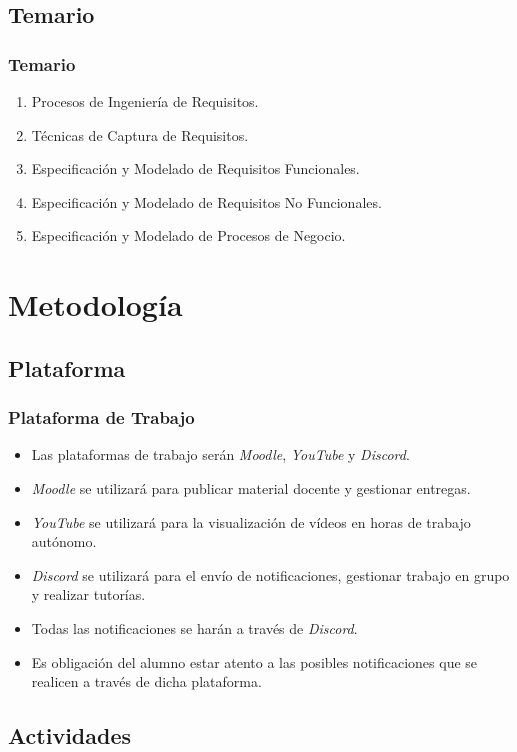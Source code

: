 \documentclass[a4paper,slidestop,xcolor=pst,dvips,blue]{beamer}
\begin{document}
\subsection{Temario}

\begin{frame}[c]
	\frametitle{Temario}
	\begin{enumerate}[<+->]
		\item Procesos de Ingeniería de Requisitos.
		\item Técnicas de Captura de Requisitos.
		\item Especificación y Modelado de Requisitos Funcionales.
		\item Especificación y Modelado de Requisitos No Funcionales.
		\item Especificación y Modelado de Procesos de Negocio.
	\end{enumerate}
\end{frame}

\section{Metodología}

\subsection{Plataforma}

\begin{frame}[c]
	\frametitle{Plataforma de Trabajo}
	\begin{itemize}[<+->]
		\item Las plataformas de trabajo serán \emph{Moodle}, \emph{YouTube} y \emph{Discord}.
		\item \emph{Moodle} se utilizará para publicar material docente y gestionar entregas.
		\item \emph{YouTube} se utilizará para la visualización de vídeos en horas de trabajo autónomo.
		\item \emph{Discord} se utilizará para el envío de notificaciones, gestionar trabajo en grupo y realizar tutorías.
		\item Todas las notificaciones se harán a través de \emph{Discord}.
		\item Es obligación del alumno estar atento a las posibles notificaciones que se realicen a través de dicha plataforma.
	\end{itemize}
\end{frame}

\subsection{Actividades}
\end{document}
